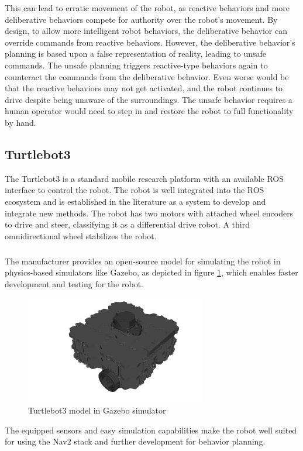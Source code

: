 This can lead to erratic movement of the robot, as reactive behaviors and more deliberative behaviors compete for authority over the robot's movement. By design, to allow more intelligent robot behaviors, the deliberative behavior can override commands from reactive behaviors. However, the deliberative behavior's planning is based upon a false representation of reality, leading to unsafe commands. The unsafe planning triggers reactive-type behaviors again to counteract the commands from the deliberative behavior. Even worse would be that the reactive behaviors may not get activated, and the robot continues to drive despite being unaware of the surroundings. The unsafe behavior requires a human operator would need to step in and restore the robot to full functionality by hand. 



\subsection{Turtlebot3}
The Turtlebot3 is a standard mobile research platform with an available ROS interface to control the robot. The robot is well integrated into the ROS ecosystem and is established in the literature as a system to develop and integrate new methods. 
The robot has two motors with attached wheel encoders to drive and steer, classifying it as a differential drive robot. A third omnidirectional wheel stabilizes the robot. 
\subparagraph*{}
The manufacturer provides an open-source model for simulating the robot in physics-based simulators like Gazebo, as depicted in figure \ref{fig:turtlebot}, which enables faster development and testing for the robot. 
\begin{center}
\begin{figure}[ht]   
	\includegraphics[width=0.7\textwidth]{images/turtlebot_sim.png}
	\caption{Turtlebot3 model in Gazebo simulator}
	\label{fig:turtlebot}
\end{figure}
\end{center}
The equipped sensors and easy simulation capabilities make the robot well suited for using the Nav2 stack and further development for behavior planning. 

